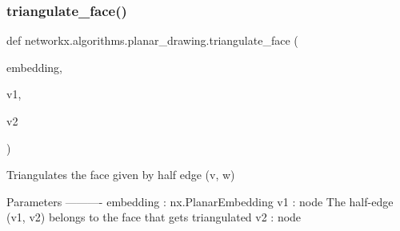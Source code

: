 \subsubsection{\texorpdfstring{triangulate\+\_\+face()}{triangulate\_face()}}
{\footnotesize\ttfamily def networkx.\+algorithms.\+planar\+\_\+drawing.\+triangulate\+\_\+face (\begin{DoxyParamCaption}\item[{}]{embedding,  }\item[{}]{v1,  }\item[{}]{v2 }\end{DoxyParamCaption})}

\begin{DoxyVerb}Triangulates the face given by half edge (v, w)

Parameters
----------
embedding : nx.PlanarEmbedding
v1 : node
    The half-edge (v1, v2) belongs to the face that gets triangulated
v2 : node
\end{DoxyVerb}
 